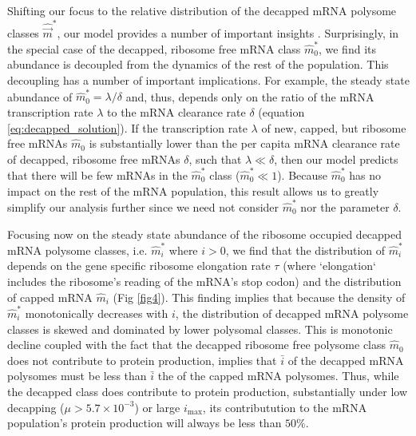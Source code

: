 \documentclass[10pt,letterpaper]{article}
\newcommand{\imax}{\ensuremath{{i_{\max}}}\xspace}
\newcommand{\mhat}{\ensuremath{\hat{m}}\xspace}
\newcommand{\mvec}{\ensuremath{\vec{m}}\xspace}
\newcommand{\mvechat}{\ensuremath{\hat{\mvec}}\xspace}
\newcommand{\mvechatstar}{\ensuremath{\mvechat^*}\xspace}
\newcommand{\MRL}{\ensuremath{\bar{i}}\xspace}
\begin{document}
Shifting our focus to the relative distribution of the decapped mRNA polysome classes \mvechatstar, our model provides a number of important insights .
Surprisingly, in the special case of the decapped, ribosome free mRNA class $\mhat_0^*$, we find its abundance is decoupled from the dynamics of the rest of the population.
  This decoupling has a number of important implications.
  For example, the steady state abundance of $\mhat_0^* = \lambda/\delta$ and, thus, depends only on the ratio of the mRNA transcription rate $\lambda$ to the mRNA clearance rate $\delta$ (equation \ref{eq:decapped_solution}).
  If the transcription rate $\lambda$ of new, capped, but ribosome free mRNAs $\mhat_0$ is substantially lower than the per capita mRNA clearance rate of decapped, ribosome free mRNAs $\delta$, such that  $\lambda \ll \delta$, then our model predicts that there will be few mRNAs in the $\mhat_0^*$ class ($\mhat_0^* \ll 1$).
  Because $\mhat^*_0$ has no impact on the rest of the mRNA population, this result allows us to greatly simplify our analysis further since we need not consider $\mhat_0^*$ nor the parameter $\delta$.

Focusing now on the steady state abundance of the ribosome occupied decapped mRNA polysome classes, i.e.  $\mhat_i^*$ where $i > 0$, we find that the distribution of $\mhat^*_i$  depends on the gene specific ribosome elongation rate $\tau$ (where `elongation`  includes the ribosome's reading of the mRNA's stop codon) and the distribution of capped mRNA $\mhat_i$ (Fig \ref{fig4}).
\label{item:protein_production} This finding implies that because the density of $\mhat^*_i$ monotonically decreases with $i$, the distribution of decapped mRNA polysome classes is skewed and dominated by lower polysomal classes.
  This is monotonic decline coupled with the fact that the decapped ribosome free polysome class $\mhat_0$ does not contribute to protein production, implies that \MRL of the decapped mRNA polysomes must be less than \MRL the of the capped mRNA polysomes.
  Thus, while the decapped class does contribute to protein production, substantially under low decapping ($\mu> 5.7 \times 10^{-3}$) or large \imax, its contributution to the mRNA population's protein production will always be less than  $50\%$.
\end{document}
